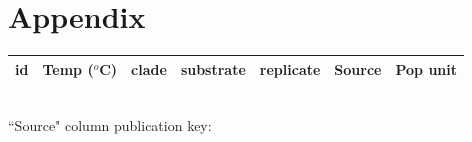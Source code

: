 \documentclass[a4paper, 11pt]{article}
\begin{document}
	\section*{Appendix}
\begin{table}
		\caption{Table showing dataset id details for Fig.\ref{lineOut}}\label{table:source}
	\begin{tabular}{l|llllll}
		id&Temp ($^{o}$C)&clade&substrate&replicate&Source&Pop unit\\\hline
	\end{tabular}\\
	``Source" column publication key:\\
\begin{longtable}{p{.05\linewidth}p{.9\linewidth}}
\end{longtable}
\end{table}
\end{document}
